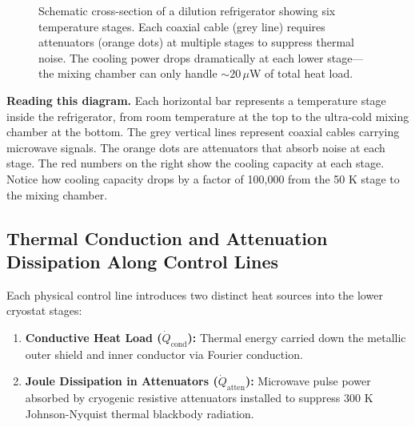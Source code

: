 \begin{figure}[htbp]
    \caption{Schematic cross-section of a dilution refrigerator showing six temperature stages. Each coaxial cable (grey line) requires attenuators (orange dots) at multiple stages to suppress thermal noise. The cooling power drops dramatically at each lower stage---the mixing chamber can only handle $\sim 20\,\mu$W of total heat load.}
    \label{fig:cryostat_cross_section}
\end{figure}

\noindent \textbf{Reading this diagram.} Each horizontal bar represents a temperature stage inside the refrigerator, from room temperature at the top to the ultra-cold mixing chamber at the bottom. The grey vertical lines represent coaxial cables carrying microwave signals. The orange dots are attenuators that absorb noise at each stage. The red numbers on the right show the cooling capacity at each stage. Notice how cooling capacity drops by a factor of 100,000 from the 50 K stage to the mixing chamber.

\subsection{Thermal Conduction and Attenuation Dissipation Along Control Lines}

Each physical control line introduces two distinct heat sources into the lower cryostat stages:
\begin{enumerate}
    \item \textbf{Conductive Heat Load ($\dot{Q}_{\text{cond}}$):} Thermal energy carried down the metallic outer shield and inner conductor via Fourier conduction.
    \item \textbf{Joule Dissipation in Attenuators ($\dot{Q}_{\text{atten}}$):} Microwave pulse power absorbed by cryogenic resistive attenuators installed to suppress $300\text{ K}$ Johnson-Nyquist thermal blackbody radiation.
\end{enumerate}

